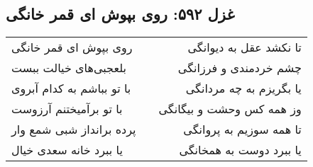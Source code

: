 \begin{center}
\section*{غزل ۵۹۲: روی بپوش ای قمر خانگی}
\label{sec:592}
\begin{longtable}{l p{0.5cm} r}
روی بپوش ای قمر خانگی
&&
تا نکشد عقل به دیوانگی
\\
بلعجبی‌های خیالت ببست
&&
چشم خردمندی و فرزانگی
\\
با تو بباشم به کدام آبروی
&&
یا بگریزم به چه مردانگی
\\
با تو برآمیختنم آرزوست
&&
وز همه کس وحشت و بیگانگی
\\
پرده برانداز شبی شمع وار
&&
تا همه سوزیم به پروانگی
\\
یا ببرد خانه سعدی خیال
&&
یا ببرد دوست به همخانگی
\\
\end{longtable}
\end{center}
